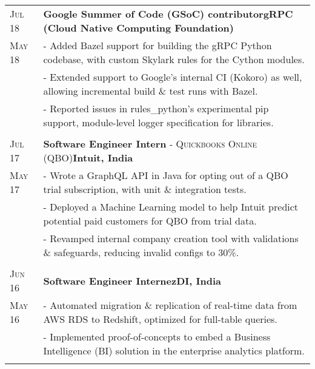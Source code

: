 \documentclass[a4paper,10pt]{extarticle} %
\begin{document}
\begin{tabularx}{\linewidth}{ l | X }
\textsc{Jul 18} & \textbf{Google Summer of Code (GSoC) contributor}\hfill\textbf{gRPC (Cloud Native Computing Foundation)}\\
\textsc{May 18}& {- Added Bazel support for building the gRPC Python codebase, with custom Skylark rules for the Cython modules.}\\
& {- Extended support to Google's internal CI (Kokoro) as well, allowing incremental build \& test runs with Bazel.}\\
& {- Reported issues in rules\_python's experimental pip support, module-level logger specification for libraries.}\\
\multicolumn{2}{c}{} \\


\textsc{Jul 17} & \textbf{Software Engineer Intern} \textsc{- Quickbooks Online (QBO)}\hfill\textbf{Intuit, India}\\
\textsc{May 17}& {- Wrote a GraphQL API in Java for opting out of a QBO trial subscription, with unit \& integration tests.}\\
& {- Deployed a Machine Learning model to help Intuit predict potential paid customers for QBO from trial data.}\\
& {- Revamped internal company creation tool with validations \& safeguards, reducing invalid configs to 30\%.}\\
\multicolumn{2}{c}{} \\

\textsc{Jun 16} & \textbf{Software Engineer Intern}\hfill\textbf{ezDI, India}\\
\textsc{May 16}& {- Automated migration \& replication of real-time data from AWS RDS to Redshift, optimized for full-table queries.}\\
& {- Implemented proof-of-concepts to embed a Business Intelligence (BI) solution in the enterprise analytics platform.}\\
\multicolumn{2}{c}{} \\


\end{tabularx}
\end{document}
